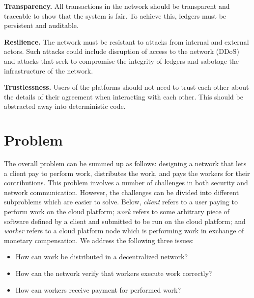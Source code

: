\textbf{Transparency.} All transactions in the network should be transparent and traceable to show that the system is fair. To achieve this, ledgers must be persistent and auditable.

\textbf{Resilience.} The network must be resistant to attacks from internal and external actors. Such attacks could include disruption of access to the network (DDoS) and attacks that seek to compromise the integrity of ledgers and sabotage the infrastructure of the network.

\textbf{Trustlessness.} Users of the platforms should not need to trust each other about the details of their agreement when interacting with each other. This should be abstracted away into deterministic code.

\section{Problem}
\label{sec:intro:problem}
The overall problem can be summed up as follows: designing a network that lets a client pay to perform work, distributes the work, and pays the workers for their contributions. This problem involves a number of challenges in both security and network communication. However, the challenges can be divided into different subproblems which are easier to solve. Below, \emph{client} refers to a user paying to perform work on the cloud platform; \emph{work} refers to some arbitrary piece of software defined by a client and submitted to be run on the cloud platform; and \emph{worker} refers to a cloud platform node which is performing work in exchange of monetary compensation.
We address the following three issues:
\begin{itemize}
\item How can work be distributed in a decentralized network?
\item How can the network verify that workers execute work correctly?
\item How can workers receive payment for performed work?
\end{itemize}

